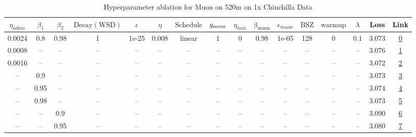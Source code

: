 \begin{table}[H]
\centering
\caption{Hyperparameter ablation for Muon on 520m on 1x Chinchilla Data}
\label{tab:ablation_muon_520m_on_1x_chinchilla_data}
\begin{tabular}{cccccccccccccccc}
\toprule
$\eta_{adam}$ & $\beta_1$ & $\beta_2$ & $\mathrm{Decay (WSD)}$ & $\epsilon$ & $\eta$ & $\mathrm{Schedule}$ & $g_{\mathrm{norm}}$ & $\eta_{min}$ & $\mathrm{\beta_{muon}}$ & $\epsilon_{muon}$ & $\mathrm{BSZ}$ & $\mathrm{warmup}$ & $\lambda$ & Loss & Link \\
\midrule
0.0024 & 0.8 & 0.98 & 1 & 1e-25 & 0.008 & linear & 1 & 0 & 0.98 & 1e-05 & 128 & 0 & 0.1 & 3.073 & \href{https://wandb.ai/marin-community/optimizer-scaling/runs/sweep-520m-10B-muonb6462flr0.008-wd0.1-minlr0-warmup0-b10.8-b20.-bb54fc}{0} \\
\midrule
0.0008 & -- & -- & -- & -- & -- & -- & -- & -- & -- & -- & -- & -- & -- & 3.076 & \href{https://wandb.ai/marin-community/optimizer-scaling/runs/sweep-520m-10B-muoned1be6lr0.008-wd0.1-minlr0-warmup0-b10.8-b20.-472a68}{1} \\
0.0016 & -- & -- & -- & -- & -- & -- & -- & -- & -- & -- & -- & -- & -- & 3.072 & \href{https://wandb.ai/marin-community/optimizer-scaling/runs/sweep-520m-10B-muoncab636lr0.008-wd0.1-minlr0-warmup0-b10.8-b20.-df4920}{2} \\
-- & 0.9 & -- & -- & -- & -- & -- & -- & -- & -- & -- & -- & -- & -- & 3.073 & \href{https://wandb.ai/marin-community/optimizer-scaling/runs/sweep-520m-10B-muon3aa627lr0.008-wd0.1-minlr0-warmup0-b10.9-b20.-d88a74}{3} \\
-- & 0.95 & -- & -- & -- & -- & -- & -- & -- & -- & -- & -- & -- & -- & 3.074 & \href{https://wandb.ai/marin-community/optimizer-scaling/runs/sweep-520m-10B-muon6de49alr0.008-wd0.1-minlr0-warmup0-b10.95-b20-09ab54}{4} \\
-- & 0.98 & -- & -- & -- & -- & -- & -- & -- & -- & -- & -- & -- & -- & 3.073 & \href{https://wandb.ai/marin-community/optimizer-scaling/runs/sweep-520m-10B-muon73c7eelr0.008-wd0.1-minlr0-warmup0-b10.98-b20-25814b}{5} \\
-- & -- & 0.9 & -- & -- & -- & -- & -- & -- & -- & -- & -- & -- & -- & 3.090 & \href{https://wandb.ai/marin-community/optimizer-scaling/runs/sweep-520m-10B-muon076a83lr0.008-wd0.1-minlr0-warmup0-b10.8-b20.-d5cd2a}{6} \\
-- & -- & 0.95 & -- & -- & -- & -- & -- & -- & -- & -- & -- & -- & -- & 3.080 & \href{https://wandb.ai/marin-community/optimizer-scaling/runs/sweep-520m-10B-muon43dc84lr0.008-wd0.1-minlr0-warmup0-b10.8-b20.-b11016}{7} \\

\end{tabular}
\end{table}

